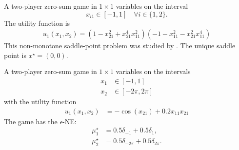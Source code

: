 \begin{game}\label{ex.mertikopoulos18.2.2}
A two-player zero-sum game in $1 \times 1$ variables on the interval
$$x_{i1} \in [-1,1] \quad \forall i \in \{1,2\}.$$
The utility function is
\begin{align*}
u_{1}\left( x_{1}, x_{2} \right) = \left( 1 - x_{21}^{2} + x_{21}^{4} x_{11}^{2} \right) \left( -1 - x_{11}^{2} - x_{21}^{2} x_{11}^{4} \right)
\end{align*}
This non-monotone saddle-point problem was studied by \textcite[(2.2)]{mertikopoulos.lecouat.ea:optimistic}. The unique saddle point is $x^\star = (0,0)$.
\end{game}


\noindent
\begin{minipage}[c]{0.6\textwidth}
\begin{game}\label{ex.razaviyayn20.5.1}
A two-player zero-sum game in $1 \times 1$ variables on the intervals
\begin{align*}
    x_1 &\in [-1,1]\\
    x_2 &\in [-2\pi, 2\pi]
\end{align*}
with the utility function \cite[Example~1]{razaviyayn.huang.ea:nonconvex}
\begin{align*}
u_{1}\left( x_{1}, x_{2} \right) &=  - \cos\left( x_{21} \right) + 0.2 x_{11} x_{21}
\end{align*}
The game has the $\epsilon$-NE:
\begin{align*}
\mu_1^\star &= 0.5\delta_{ -1 } + 0.5\delta_{ 1 }, \\
\mu_2^\star &= 0.5\delta_{ -2\pi } + 0.5\delta_{ 2\pi }.
\end{align*}

\end{game}
\strut
\end{minipage}
\hfill
\begin{minipage}[c]{0.35\textwidth}
\end{minipage}

